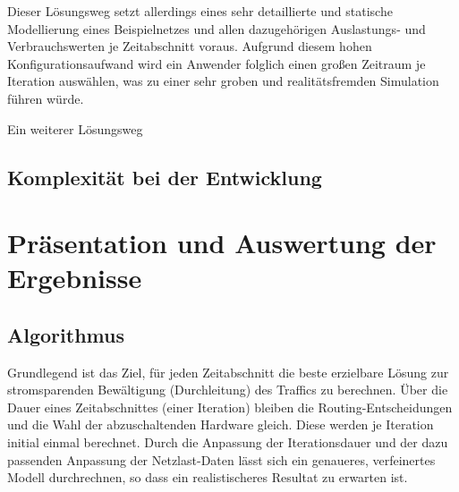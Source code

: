 \documentclass[12pt,titlepage]{article}
\begin{document}
Dieser Lösungsweg setzt allerdings eines sehr detaillierte und statische Modellierung eines Beispielnetzes und allen dazugehörigen Auslastungs- und Verbrauchswerten je Zeitabschnitt voraus. Aufgrund diesem hohen Konfigurationsaufwand wird ein Anwender folglich einen großen Zeitraum je Iteration auswählen, was zu einer sehr groben und realitätsfremden Simulation führen würde.

Ein weiterer Lösungsweg  


\subsection{Komplexität bei der Entwicklung}

\section{Präsentation und Auswertung der Ergebnisse} \label{Ergebnisse}
\subsection{Algorithmus}
Grundlegend ist das Ziel, für jeden Zeitabschnitt die beste erzielbare Lösung zur stromsparenden Bewältigung (Durchleitung) des Traffics zu berechnen. Über die Dauer eines Zeitabschnittes (einer Iteration) bleiben die Routing-Entscheidungen und die Wahl der abzuschaltenden Hardware gleich. Diese werden je Iteration initial einmal berechnet. Durch die Anpassung der Iterationsdauer und der dazu passenden Anpassung der Netzlast-Daten lässt sich ein genaueres, verfeinertes Modell durchrechnen, so dass ein realistischeres Resultat zu erwarten ist.
\end{document}
